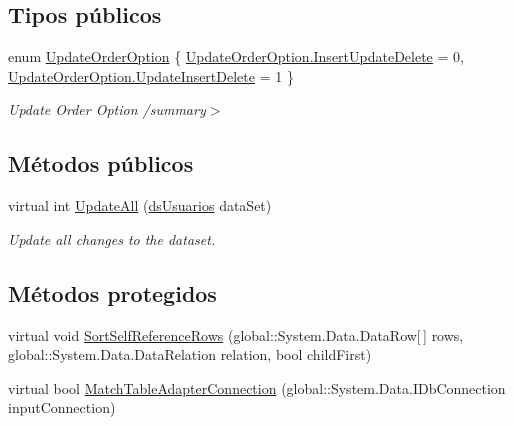 \subsection*{Tipos públicos}
\begin{DoxyCompactItemize}
\item 
enum \hyperlink{class_proyecto___integrador__3_1_1ds_usuarios_table_adapters_1_1_table_adapter_manager_a3e5008a49cc02b346d809e432b3a9412}{Update\-Order\-Option} \{ \hyperlink{class_proyecto___integrador__3_1_1ds_usuarios_table_adapters_1_1_table_adapter_manager_a3e5008a49cc02b346d809e432b3a9412a27b77cb15d3da7ded0250d0001bc6755}{Update\-Order\-Option.\-Insert\-Update\-Delete} = 0, 
\hyperlink{class_proyecto___integrador__3_1_1ds_usuarios_table_adapters_1_1_table_adapter_manager_a3e5008a49cc02b346d809e432b3a9412a894fcc001e51f673d3fb5f3096473dd8}{Update\-Order\-Option.\-Update\-Insert\-Delete} = 1
 \}
\begin{DoxyCompactList}\small\item\em Update Order Option /summary$>$ \end{DoxyCompactList}\end{DoxyCompactItemize}
\subsection*{Métodos públicos}
\begin{DoxyCompactItemize}
\item 
virtual int \hyperlink{class_proyecto___integrador__3_1_1ds_usuarios_table_adapters_1_1_table_adapter_manager_a30dda08e8a7f3836ddb694673a308d09}{Update\-All} (\hyperlink{class_proyecto___integrador__3_1_1ds_usuarios}{ds\-Usuarios} data\-Set)
\begin{DoxyCompactList}\small\item\em Update all changes to the dataset. \end{DoxyCompactList}\end{DoxyCompactItemize}
\subsection*{Métodos protegidos}
\begin{DoxyCompactItemize}
\item 
virtual void \hyperlink{class_proyecto___integrador__3_1_1ds_usuarios_table_adapters_1_1_table_adapter_manager_a43d1da94841a91242a52550410150581}{Sort\-Self\-Reference\-Rows} (global\-::\-System.\-Data.\-Data\-Row\mbox{[}$\,$\mbox{]} rows, global\-::\-System.\-Data.\-Data\-Relation relation, bool child\-First)
\item 
virtual bool \hyperlink{class_proyecto___integrador__3_1_1ds_usuarios_table_adapters_1_1_table_adapter_manager_abecbfe403471a79ea579ec5584df4d6d}{Match\-Table\-Adapter\-Connection} (global\-::\-System.\-Data.\-I\-Db\-Connection input\-Connection)
\end{DoxyCompactItemize}
